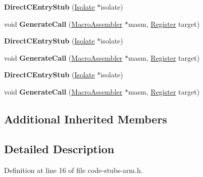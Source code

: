 \begin{DoxyCompactItemize}
{\bfseries Direct\+C\+Entry\+Stub} (\mbox{\hyperlink{classv8_1_1internal_1_1Isolate}{Isolate}} $\ast$isolate)
\item 
\mbox{\label{classv8_1_1internal_1_1DirectCEntryStub_a8e43b7b6c17a7384c4e0aba4bce95442}} 
void {\bfseries Generate\+Call} (\mbox{\hyperlink{classv8_1_1internal_1_1MacroAssembler}{Macro\+Assembler}} $\ast$masm, \mbox{\hyperlink{classv8_1_1internal_1_1Register}{Register}} target)
\item 
\mbox{\label{classv8_1_1internal_1_1DirectCEntryStub_a4180bdff05dfde69a280540d2ca8b449}} 
{\bfseries Direct\+C\+Entry\+Stub} (\mbox{\hyperlink{classv8_1_1internal_1_1Isolate}{Isolate}} $\ast$isolate)
\item 
\mbox{\label{classv8_1_1internal_1_1DirectCEntryStub_a8e43b7b6c17a7384c4e0aba4bce95442}} 
void {\bfseries Generate\+Call} (\mbox{\hyperlink{classv8_1_1internal_1_1MacroAssembler}{Macro\+Assembler}} $\ast$masm, \mbox{\hyperlink{classv8_1_1internal_1_1Register}{Register}} target)
\item 
\mbox{\label{classv8_1_1internal_1_1DirectCEntryStub_a4180bdff05dfde69a280540d2ca8b449}} 
{\bfseries Direct\+C\+Entry\+Stub} (\mbox{\hyperlink{classv8_1_1internal_1_1Isolate}{Isolate}} $\ast$isolate)
\item 
\mbox{\label{classv8_1_1internal_1_1DirectCEntryStub_a8e43b7b6c17a7384c4e0aba4bce95442}} 
void {\bfseries Generate\+Call} (\mbox{\hyperlink{classv8_1_1internal_1_1MacroAssembler}{Macro\+Assembler}} $\ast$masm, \mbox{\hyperlink{classv8_1_1internal_1_1Register}{Register}} target)
\end{DoxyCompactItemize}
\subsection*{Additional Inherited Members}


\subsection{Detailed Description}


Definition at line 16 of file code-\/stubs-\/arm.\+h.



